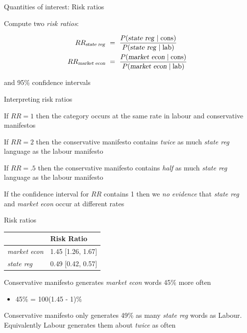 \documentclass{hertieteaching}
\begin{document}
\begin{frame}{Quantities of interest: Risk ratios}
\protect\hypertarget{quantities-of-interest-risk-ratios}{}

Compute two \emph{risk ratios}:

\[
\begin{aligned}
RR_{\text{\textsl{state reg}}} & ~=~ \frac{P(\text{\textsl{state reg}} \mid \text{cons})}
{P(\text{\textsl{state reg}} \mid \text{lab})}\\
RR_{\text{\textsl{market econ}}} & ~=~ \frac{P(\text{\textsl{market econ}} \mid \text{cons})}
{P(\text{\textsl{market econ}} \mid \text{lab})}
\end{aligned}
\]

and 95\% confidence intervals

\end{frame}

\begin{frame}{Interpreting risk ratios}
\protect\hypertarget{interpreting-risk-ratios}{}

If \(RR=1\) then the category occurs at the same rate in labour and
conservative manifestos

If \(RR=2\) then the conservative manifesto contains \emph{twice} as
much \emph{state reg} language as the labour manifesto

If \(RR=.5\) then the conservative manifesto contains \emph{half} as
much \emph{state reg} language as the labour manifesto

If the confidence interval for \(RR\) contains 1 then we \emph{no
evidence} that \emph{state reg} and \emph{market econ} occur at
different rates

\end{frame}

\begin{frame}{Risk ratios}
\protect\hypertarget{risk-ratios}{}

\begin{longtable}[]{@{}ll@{}}
\toprule
& Risk Ratio\tabularnewline
\midrule
\endhead
\emph{market econ} & 1.45 {[}1.26, 1.67{]}\tabularnewline
\emph{state reg} & 0.49 {[}0.42, 0.57{]}\tabularnewline
\bottomrule
\end{longtable}

Conservative manifesto generates \emph{market econ} words 45\% more
often

\begin{itemize}
\item
  45\% = 100(1.45 - 1)\%
\end{itemize}

Conservative manifesto only generates 49\% as many \emph{state reg}
words as Labour. Equivalently Labour generates them about \emph{twice}
as often

\end{frame}
\end{document}

